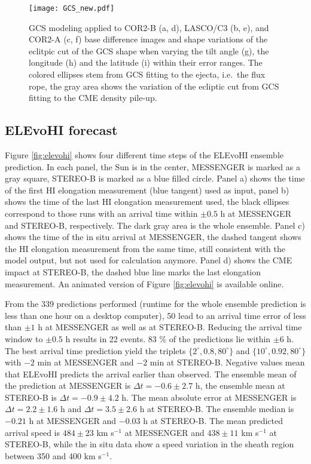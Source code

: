 \documentclass[draft]{agujournal}
\begin{document}
\begin{figure}[h]
\centering
\texttt{[image: GCS\_new.pdf]}
\caption{GCS modeling applied to COR2-B (a, d), LASCO/C3 (b, e), and COR2-A (c, f) base difference images and shape variations of the eclitpic cut of the GCS shape when varying the tilt angle (g), the longitude (h) and the latitude (i) within their error ranges. The colored ellipses stem from GCS fitting to the ejecta, i.e.\ the flux rope, the gray area shows the variation of the ecliptic cut from GCS fitting to the CME density pile-up.}
\label{fig:gcs_cut}
\end{figure}

\subsection{ELEvoHI forecast}


Figure \ref{fig:elevohi} shows four different time steps of the ELEvoHI ensemble prediction. In each panel, the Sun is in the center, MESSENGER is marked as a gray square, STEREO-B is marked as a blue filled circle. Panel a) shows the time of the first HI elongation measurement (blue tangent) used as input, panel b) shows the time of the last HI elongation measurement used, the black ellipses correspond to those runs with an arrival time within $\pm 0.5$ h at MESSENGER and STEREO-B, respectively. The dark gray area is the whole ensemble. Panel c) shows the time of the in situ arrival at MESSENGER, the dashed tangent shows the HI elongation measurement from the same time, still consistent with the model output, but not used for calculation anymore. Panel d) shows the CME impact at STEREO-B, the dashed blue line marks the last elongation measurement. An animated version of Figure \ref{fig:elevohi} is available online.

From the 339 predictions performed (runtime for the whole ensemble prediction is less than one hour on a desktop computer), 50 lead to an arrival time error of less than $\pm 1$ h at MESSENGER as well as at STEREO-B. Reducing the arrival time window to $\pm 0.5$ h results in 22 events. 83 \% of the predictions lie within $\pm 6$ h. The best arrival time prediction yield the triplets $\{2^\circ, 0.8, 80^\circ\}$ and $\{10^\circ, 0.92, 80^\circ\}$ with $-2$ min at MESSENGER and $-2$ min at STEREO-B. Negative values mean that ELEvoHI predicts the arrival earlier than observed. The ensemble mean of the prediction at MESSENGER is $\Delta t=-0.6 \pm 2.7$ h, the ensemble mean at STEREO-B is $\Delta t=-0.9 \pm 4.2$ h. The mean absolute error at MESSENGER is $\Delta t=2.2 \pm 1.6$ h and $\Delta t=3.5 \pm 2.6$ h at STEREO-B.
The ensemble median is $-0.21$ h at MESSENGER and $-0.03$ h at STEREO-B. The mean predicted arrival speed is $484 \pm 23$ km s$^{-1}$ at MESSENGER and $438 \pm 11$ km s$^{-1}$ at STEREO-B, while the in situ data show a speed variation in the sheath region between 350 and 400 km s$^{-1}$.
\end{document}
